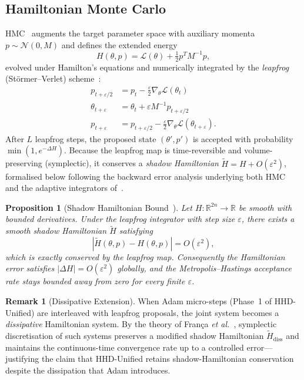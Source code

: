 \documentclass[11pt]{article}
\newtheorem{proposition}[theorem]{Proposition}
\theoremstyle{definition}
\newtheorem{remark}[theorem]{Remark}
\newcommand{\tHH}{\widetilde{H}}
\begin{document}
\subsection{Hamiltonian Monte Carlo}

HMC~\cite{duane1987,neal2011} augments the target parameter space
with auxiliary momenta $p\sim\mathcal{N}(0,M)$ and defines the
extended energy
\begin{equation}
H(\theta,p) = \mathcal{L}(\theta) + \tfrac{1}{2}p^TM^{-1}p,
\label{eq:hmc}
\end{equation}
evolved under Hamilton's equations and numerically integrated by the
\emph{leapfrog} (St\"ormer--Verlet) scheme~\cite{leimkuhler2004}:
\begin{align}
p_{t+\varepsilon/2} &= p_t - \tfrac{\varepsilon}{2}\nabla_\theta\mathcal{L}(\theta_t)
\label{eq:lf1}\\
\theta_{t+\varepsilon} &= \theta_t + \varepsilon M^{-1}p_{t+\varepsilon/2}
\label{eq:lf2}\\
p_{t+\varepsilon}   &= p_{t+\varepsilon/2}
  - \tfrac{\varepsilon}{2}\nabla_\theta\mathcal{L}(\theta_{t+\varepsilon}).
\label{eq:lf3}
\end{align}
After $L$ leapfrog steps, the proposed state $(\theta',p')$ is
accepted with probability $\min(1,e^{-\Delta H})$. Because the
leapfrog map is time-reversible and volume-preserving (symplectic),
it conserves a \emph{shadow Hamiltonian}
$\tHH=H+O(\varepsilon^2)$, formalised below following the backward
error analysis underlying both HMC~\cite{neal2011} and the adaptive
integrators of~\cite{duruisseaux2021adaptive}.

\begin{proposition}[Shadow Hamiltonian Bound~{\cite[Thm.~IX.3.1]{hairer2006}}]
\label{prop:shadow}
Let $H:\mathbb{R}^{2n}\to\mathbb{R}$ be smooth with bounded
derivatives. Under the leapfrog integrator with step size
$\varepsilon$, there exists a smooth \emph{shadow Hamiltonian}
$\tHH$ satisfying
\[
  |\tHH(\theta,p) - H(\theta,p)| = O(\varepsilon^2),
\]
which is \emph{exactly} conserved by the leapfrog map. Consequently
the Hamiltonian error satisfies $|\Delta H|=O(\varepsilon^2)$
globally, and the Metropolis--Hastings acceptance rate stays bounded
away from zero for every finite $\varepsilon$.
\end{proposition}

\begin{remark}[Dissipative Extension]
\label{rem:dissipative}
When Adam micro-steps (Phase~1 of HHD-Unified) are interleaved with
leapfrog proposals, the joint system becomes a \emph{dissipative}
Hamiltonian system. By the theory of Fran\c{c}a \emph{et
al.}~\cite{franca2021dissipative}, symplectic discretisation of such
systems preserves a modified shadow Hamiltonian $\tHH_{\mathrm{diss}}$
and maintains the continuous-time convergence rate up to a controlled
error---justifying the claim that HHD-Unified retains shadow-Hamiltonian
conservation despite the dissipation that Adam introduces.
\end{remark}
\end{document}
